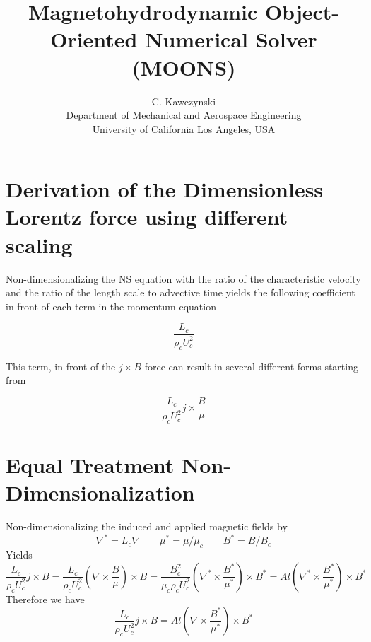 \documentclass[11pt]{article}
\begin{document}
\doublespacing
\title{Magnetohydrodynamic Object-Oriented Numerical Solver (MOONS)}
\author{C. Kawczynski \\
Department of Mechanical and Aerospace Engineering \\
University of California Los Angeles, USA\\
}
\maketitle

\section{Derivation of the Dimensionless Lorentz force using different scaling}
Non-dimensionalizing the NS equation with the ratio of the characteristic velocity and the ratio of the length scale to advective time yields the following coefficient in front of each term in the momentum equation

\begin{equation}
	\frac{L_c}{\rho_c U_c^2}
\end{equation}

This term, in front of the $j\times B$ force can result in several different forms starting from

\begin{equation}
	 \frac{L_c}{\rho_c U_c^2} j \times \frac{B}{\mu}
\end{equation}

\section{Equal Treatment Non-Dimensionalization}
Non-dimensionalizing the induced and applied magnetic fields by
\begin{equation}
	\nabla^* = L_c \nabla \qquad
	\mu^* = \mu / \mu_c \qquad
	B^* = B/B_c
\end{equation}
Yields
\begin{equation}
	 \frac{L_c}{\rho_c U_c^2} j \times B
	 =
	 \frac{L_c}{\rho_c U_c^2} \left( \nabla \times \frac{B}{\mu} \right) \times B
	 =
	\frac{B_c^2}{\mu_c \rho_c U_c^2} \left( \nabla^* \times \frac{B^*}{\mu^*} \right) \times B^*
	 =
	Al \left( \nabla^* \times \frac{B^*}{\mu^*} \right) \times B^*
\end{equation}
Therefore we have
\begin{equation}
	\boxed{
	 \frac{L_c}{\rho_c U_c^2} j \times B
	 =
	Al \left( \nabla \times \frac{B^*}{\mu^*} \right) \times B^*
	}
\end{equation}
\end{document}
